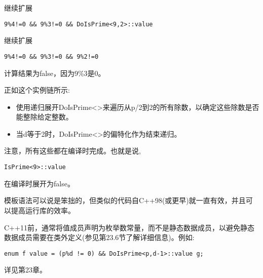 继续扩展

\begin{lstlisting}[style=styleCXX]
9%4!=0 && 9%3!=0 && DoIsPrime<9,2>::value
\end{lstlisting}

继续扩展

\begin{lstlisting}[style=styleCXX]
9%4!=0 && 9%3!=0 && 9%2!=0
\end{lstlisting}

计算结果为false，因为9\%3是0。

正如这个实例链所示:

\begin{itemize}
\item 
使用递归展开DoIsPrime<>来遍历从p/2到2的所有除数，以确定这些除数是否能整除给定整数。

\item 
当d等于2时，DoIsPrime<>的偏特化作为结束递归。
\end{itemize}

注意，所有这些都在编译时完成。也就是说,

\begin{lstlisting}[style=styleCXX]
IsPrime<9>::value
\end{lstlisting}

在编译时展开为false。

模板语法可以说是笨拙的，但类似的代码自C++98(或更早)就一直有效，并且可以提高运行库的效率。

\begin{tcolorbox}[colback=webgreen!5!white,colframe=webgreen!75!black]
\hspace*{0.75cm}C++11前，通常将值成员声明为枚举数常量，而不是静态数据成员，以避免静态数据成员需要在类外定义(参见第23.6节了解详细信息)。例如:
\begin{lstlisting}[style=styleCXX]
enum f value = (p%d != 0) && DoIsPrime<p,d-1>::value g;
\end{lstlisting}
\end{tcolorbox}

详见第23章。


























